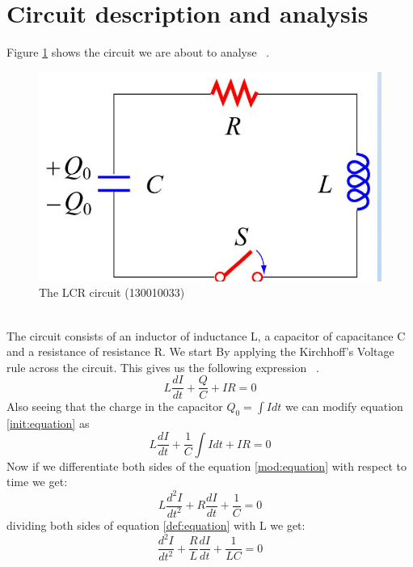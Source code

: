 \documentclass[12pt,a4paper]{report}
\begin{document}
\section{Circuit description and analysis}
Figure \ref{fig:circuit} shows the circuit we are about to analyse ~\cite{mit:pres}.
\begin{figure}[h!]
\includegraphics[width=\linewidth]{lcr.jpg}
\caption{The LCR circuit (130010033)}
\label{fig:circuit}
\end{figure}\\
The circuit consists of an inductor of inductance L, a capacitor of capacitance C and a resistance of resistance R.
We start By applying the Kirchhoff's Voltage rule across the circuit. This gives us the following expression ~\cite{wiki:LCR}.
\begin{equation}
L\frac{dI}{dt}+\frac{Q}{C}+IR=0
\label{init:equation}
\end{equation}
Also seeing that the charge in the capacitor $Q_0=\int{Idt}$ we can modify equation \textcolor{blue}{\ref{init:equation}} as
\begin{equation}
L\frac{dI}{dt}+\frac{1}{C}\int{Idt}+IR=0
\label{mod:equation}
\end{equation}
Now if we differentiate both sides of the equation \textcolor{blue}{\ref{mod:equation}} with respect to time we get:
\begin{equation}
L\frac{d^2I}{dt^2}+R\frac{dI}{dt}+\frac{1}{C}=0
\label{def:equation}
\end{equation}
dividing both sides of equation \textcolor{blue}{\ref{def:equation}} with L we get:
\begin{equation}
\frac{d^2I}{dt^2}+\frac{R}{L}\frac{dI}{dt}+\frac{1}{LC}=0
\label{findef:equation}
\end{equation}
\end{document}
